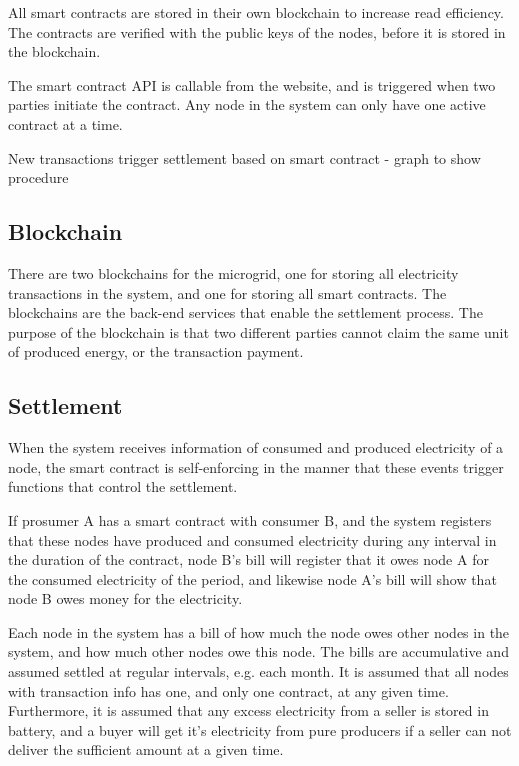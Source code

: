 All smart contracts are stored in their own blockchain to increase read efficiency. The contracts are verified with the public keys of the nodes, before it is stored in the blockchain.

The smart contract API is callable from the website, and is triggered when two parties initiate the contract. Any node in the system can only have one active contract at a time.

New transactions trigger settlement based on smart contract - graph to show procedure

\subsection{Blockchain}
There are two blockchains for the microgrid, one for storing all electricity transactions in the system, and one for storing all smart contracts. The blockchains are the back-end services that enable the settlement process. The purpose of the blockchain is that two different parties cannot claim the same unit of produced energy, or the transaction payment.

\subsection{Settlement}
When the system receives information of consumed and produced electricity of a node, the smart contract is self-enforcing in the manner that these events trigger functions that control the settlement. 

If prosumer A has a smart contract with consumer B, and the system registers that these nodes have produced and consumed electricity during any interval in the duration of the contract, node B's bill will register that it owes node A for the consumed electricity of the period, and likewise node A's bill will show that node B owes money for the electricity. 

Each node in the system has a bill of how much the node owes other nodes in the system, and how much other nodes owe this node. The bills are accumulative and assumed settled at regular intervals, e.g. each month. It is assumed that all nodes with transaction info has one, and only one contract, at any given time. Furthermore, it is assumed that any excess electricity from a seller is stored in battery, and a buyer will get it's electricity from pure producers if a seller can not deliver the sufficient amount at a given time.

